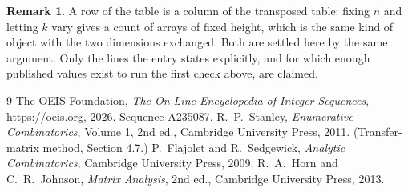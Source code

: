 \documentclass[11pt,a4paper]{article}
\theoremstyle{plain}
\theoremstyle{definition}
\newtheorem{remark}[theorem]{Remark}
\begin{document}
\begin{remark}
A row of the table is a column of the transposed table: fixing $n$ and letting $k$ vary gives a
count of arrays of fixed height, which is the same kind of object with the two dimensions
exchanged. Both are settled here by the same argument. Only the lines the entry states
explicitly, and for which enough published values exist to run the first check above, are
claimed.
\end{remark}

\begin{thebibliography}{9}
 The OEIS Foundation, \emph{The On-Line Encyclopedia of Integer
Sequences}, \url{https://oeis.org}, 2026. Sequence A235087.
 R.~P.~Stanley, \emph{Enumerative Combinatorics}, Volume 1, 2nd ed.,
Cambridge University Press, 2011. (Transfer-matrix method, Section 4.7.)
 P.~Flajolet and R.~Sedgewick, \emph{Analytic Combinatorics}, Cambridge
University Press, 2009.
 R.~A.~Horn and C.~R.~Johnson, \emph{Matrix Analysis}, 2nd ed., Cambridge
University Press, 2013.
\end{thebibliography}
\end{document}
